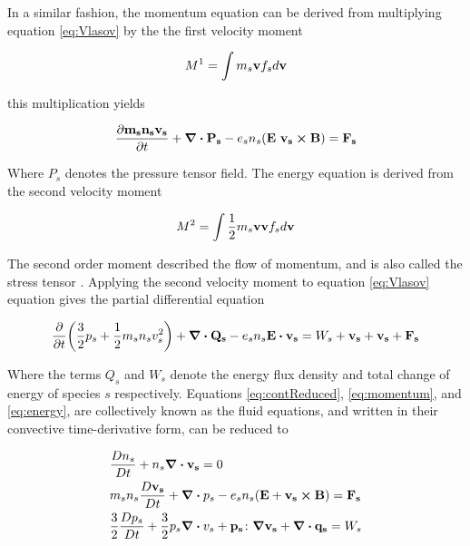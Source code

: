 In a similar fashion, the momentum equation can be derived from multiplying equation \ref{eq:Vlasov} by the the first velocity moment

\begin{equation}\label{eq:firstmoment}
    M^1 = \int m_s \vb{v} f_s d \vb{v}
\end{equation}

this multiplication yields

\begin{equation}\label{eq:momentum}
     \pdv{\vb{m_s n_s v_s}}{t} + \div{\vb{P_s}} - e_s n_s (\vb{E} \ \vb{v_s} \cross \vb{B}) = \vb{F_s}
\end{equation}

Where $P_s$ denotes the pressure tensor field. The energy equation is derived from the second velocity moment

\begin{equation}
    M^2 = \int \frac{1}{2} m_s \vb{v} \vb{v} f_s d \vb{v}
\end{equation}

The second order moment described the flow of momentum, and is also called the stress tensor . Applying the second velocity moment to equation \ref{eq:Vlasov} equation gives the partial differential equation

\begin{equation}\label{eq:energy}
    \pdv{t} (\frac{3}{2} p_s + \frac{1}{2} m_s n_s v_s^2) + \div{\vb{Q_s}} - e_s n_s \vb{E} \vdot \vb{v_s} = W_s + \vb{v_s} + \vb{v_s} + \vb{F_s}   
\end{equation}

Where the terms $Q_s$ and $W_s$ denote the energy flux density and total change of energy of species $s$ respectively. Equations \ref{eq:contReduced}, \ref{eq:momentum}, and \ref{eq:energy}, are collectively known as the fluid equations, and written in their convective time-derivative form, can be reduced to

\begin{subequations}
    \begin{align}
        &\frac{D n_s}{D t} + n_s \div{\vb{v_s}} = 0 \\
        &m_s n_s \frac{D \vb{v_s}}{D t} + \div{p_s} - e_s n_s ( \vb{E} + \vb{v_s} \cross \vb{B}) = \vb{F_s} \\
        &\frac{3}{2} \frac{D p_s}{D t} + \frac{3}{2} p_s \div{v_s} + \vb{p_s} \colon \grad{\vb{v_s}} + \div{\vb{q_s}} = W_s
    \end{align}
\end{subequations}

